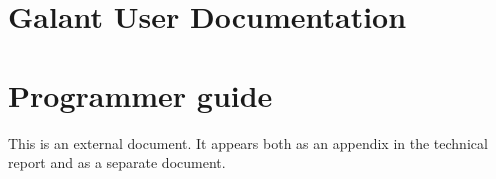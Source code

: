 \documentclass{article}
\begin{document}
\section{Galant User Documentation}



\section{Programmer guide} \label{sec:programmer_guide}

This is an external document.
It appears both as an appendix in the technical report and as
a separate document.



\end{document}
